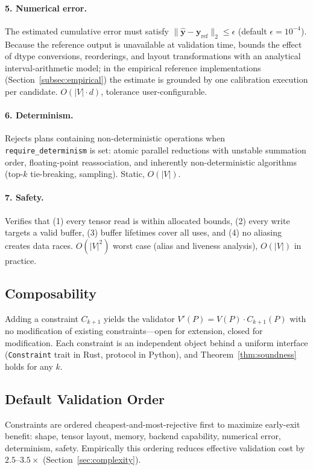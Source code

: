 \paragraph{5. Numerical error.}
The estimated cumulative error must satisfy
$\|\hat{\mathbf{y}} - \mathbf{y}_{\text{ref}}\|_2 \leq \epsilon$
(default $\epsilon = 10^{-4}$). Because the reference output is
unavailable at validation time, \gate{} bounds the effect of dtype
conversions, reorderings, and layout transformations with an analytical
interval-arithmetic model; in the empirical reference implementations
(Section~\ref{subsec:empirical}) the estimate is grounded by one
calibration execution per candidate. $O(|V| \cdot d)$, tolerance
user-configurable.

\paragraph{6. Determinism.}
Rejects plans containing non-deterministic operations when
\texttt{require\_determinism} is set: atomic parallel reductions with
unstable summation order, floating-point reassociation, and inherently
non-deterministic algorithms (top-$k$ tie-breaking, sampling). Static,
$O(|V|)$.

\paragraph{7. Safety.}
Verifies that (1) every tensor read is within allocated bounds, (2)
every write targets a valid buffer, (3) buffer lifetimes cover all
uses, and (4) no aliasing creates data races. $O(|V|^2)$ worst case
(alias and liveness analysis), $O(|V|)$ in practice.

\subsection{Composability}

Adding a constraint $C_{k+1}$ yields the validator
$V'(P) = V(P) \cdot C_{k+1}(P)$ with no modification of existing
constraints---open for extension, closed for modification. Each
constraint is an independent object behind a uniform interface
(\texttt{Constraint} trait in Rust, protocol in Python), and
Theorem~\ref{thm:soundness} holds for any $k$.

\subsection{Default Validation Order}

Constraints are ordered cheapest-and-most-rejective first to maximize
early-exit benefit: shape, tensor layout, memory, backend capability,
numerical error, determinism, safety. Empirically this ordering reduces
effective validation cost by $2.5$--$3.5\times$
(Section~\ref{sec:complexity}).
